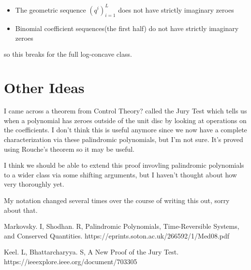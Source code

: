 \documentclass[10pt]{article}
\newcommand{\1}{\textbf{1}}
\theoremstyle{remark}
\theoremstyle{definition}
\begin{document}
\begin{itemize}
	\item The geometric sequence $(q^i)_{i=1}^L$ does not have strictly imaginary zeroes
	\item Binomial coefficient sequences(the first half) do not have strictly imaginary zeroes
\end{itemize}

so this breaks for the full log-concave class.

\section{Other Ideas}

I came across a theorem from Control Theory? called the Jury Test\cite{KB} which tells us when a polynomial has zeroes outside of the unit disc by looking at operations on the coefficients. I don't think this is useful anymore since we now have a complete characterization via these palindromic polynomials, but I'm not sure. It's proved using Rouche's theorem so it may be useful.

I think we should be able to extend this proof invovling palindromic polynomials to a wider class via some shifting arguments, but I haven't thought about how very thoroughly yet.

My notation changed several times over the course of writing this out, sorry about that.



\begin{thebibliography}{9}


 Markovsky. I, Shodhan. R,
Palindromic Polynomials, Time-Reversible Systems, and Conserved Quantities. https://eprints.soton.ac.uk/266592/1/Med08.pdf

 Keel. L, Bhattarcharyya. S,
A New Proof of the Jury Test. https://ieeexplore.ieee.org/document/703305

\end{thebibliography}
\end{document}
